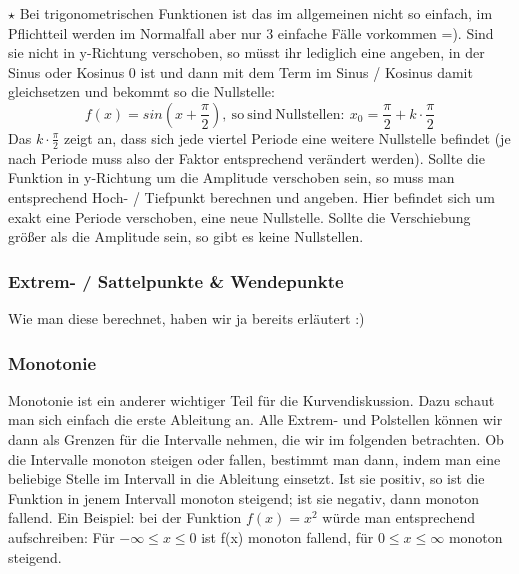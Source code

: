 		\(\star\) Bei trigonometrischen Funktionen ist das im allgemeinen nicht so
		einfach, im Pflichtteil werden im Normalfall aber nur 3 einfache Fälle
		vorkommen =). Sind sie nicht in y-Richtung verschoben, so müsst ihr lediglich
		eine angeben, in der Sinus oder Kosinus 0 ist und dann mit dem Term im Sinus /
		Kosinus damit gleichsetzen und bekommt so die Nullstelle:
		\[f(x)=sin(x+\frac{\pi}{2}),\mathrm{\ so\ sind\ Nullstellen:\
		}x_0=\frac{\pi}{2}+k\cdot \frac{\pi}{2}\]
		Das \(k\cdot \frac{\pi}{2}\) zeigt an, dass sich jede viertel Periode eine
		weitere Nullstelle befindet (je nach Periode muss also der Faktor entsprechend
		verändert werden). Sollte die Funktion in y-Richtung um die Amplitude
		verschoben sein, so muss man entsprechend Hoch- / Tiefpunkt berechnen und
		angeben. Hier befindet sich um exakt eine Periode verschoben, eine neue
		Nullstelle. Sollte die Verschiebung größer als die Amplitude sein, so gibt es
		keine Nullstellen.
		

	\subsubsection{Extrem- / Sattelpunkte \& Wendepunkte}
		Wie man diese berechnet, haben wir ja bereits erläutert :)

	\subsubsection{Monotonie}
		Monotonie ist ein anderer wichtiger Teil für die Kurvendiskussion. Dazu schaut
		man sich einfach die erste Ableitung an. Alle Extrem- und Polstellen können
		wir dann als Grenzen für die Intervalle nehmen, die wir im folgenden
		betrachten. Ob die Intervalle monoton steigen oder fallen, bestimmt man dann,
		indem man eine beliebige Stelle im Intervall in die Ableitung einsetzt. Ist
		sie positiv, so ist die Funktion in jenem Intervall monoton steigend; ist sie
		negativ, dann monoton fallend. Ein Beispiel: bei der Funktion \(f(x)=x^2\)
		würde man entsprechend aufschreiben: Für \(-\infty \le x \le 0\) ist f(x)
		monoton fallend, für \(0\le x\le \infty\) monoton steigend.
		
